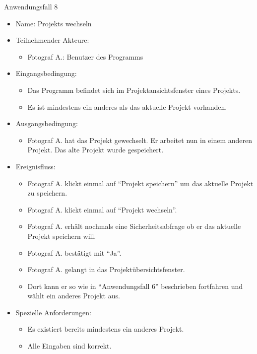 		\begin{description}
		\item[Anwendungsfall 8]
	\end{description}
	
		\begin{itemize}
			\item Name: Projekts wechseln
			\item Teilnehmender Akteure:
			\begin{itemize}
				\item	Fotograf A.: Benutzer des Programms		
			\end{itemize}
			\item Eingangsbedingung:
			\begin{itemize}
				\item	Das Programm befindet sich im Projektansichtsfenster eines Projekts.
				\item Es ist mindestens ein anderes als das aktuelle Projekt vorhanden.			
			\end{itemize}
			\item Ausgangsbedingung:
			\begin{itemize}
				\item	Fotograf A. hat das Projekt gewechselt. Er arbeitet nun in einem anderen Projekt. Das alte Projekt wurde gespeichert.
			\end{itemize}
			\item Ereignisfluss:
			\begin{itemize}
			  \item Fotograf A. klickt einmal auf "`Projekt speichern"' um das aktuelle Projekt zu speichern.
				\item Fotograf A. klickt einmal auf "`Projekt wechseln"'.
				\item Fotograf A. erhält nochmals eine Sicherheitsabfrage ob er das aktuelle Projekt speichern will.
				\item Fotograf A. bestätigt mit "`Ja"'.
				\item Fotograf A. gelangt in das Projektübersichtsfenster.
				\item Dort kann er so wie in "`Anwendungsfall 6"' beschrieben fortfahren und wählt ein anderes Projekt aus.
			\end{itemize}
			\item Spezielle Anforderungen:
			\begin{itemize}
				\item	Es existiert bereits mindestens ein anderes Projekt.
				\item Alle Eingaben sind korrekt.
			\end{itemize}			
		\end{itemize}
		

